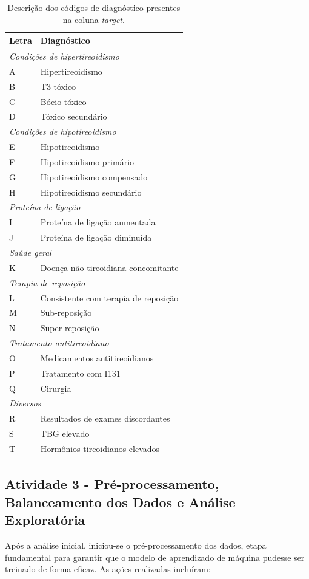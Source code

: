 \documentclass[11pt]{article}
\begin{document}
\begin{table}[H]
\centering
\caption{Descrição dos códigos de diagnóstico presentes na coluna \textit{target}.}
\label{tab:target}
\begin{tabular}{ll}
\toprule
\textbf{Letra} & \textbf{Diagnóstico} \\
\midrule
\multicolumn{2}{l}{\textit{Condições de hipertireoidismo}} \\
A & Hipertireoidismo \\
B & T3 tóxico \\
C & Bócio tóxico \\
D & Tóxico secundário \\
\midrule
\multicolumn{2}{l}{\textit{Condições de hipotireoidismo}} \\
E & Hipotireoidismo \\
F & Hipotireoidismo primário \\
G & Hipotireoidismo compensado \\
H & Hipotireoidismo secundário \\
\midrule
\multicolumn{2}{l}{\textit{Proteína de ligação}} \\
I & Proteína de ligação aumentada \\
J & Proteína de ligação diminuída \\
\midrule
\multicolumn{2}{l}{\textit{Saúde geral}} \\
K & Doença não tireoidiana concomitante \\
\midrule
\multicolumn{2}{l}{\textit{Terapia de reposição}} \\
L & Consistente com terapia de reposição \\
M & Sub-reposição \\
N & Super-reposição \\
\midrule
\multicolumn{2}{l}{\textit{Tratamento antitireoidiano}} \\
O & Medicamentos antitireoidianos \\
P & Tratamento com I131 \\
Q & Cirurgia \\
\midrule
\multicolumn{2}{l}{\textit{Diversos}} \\
R & Resultados de exames discordantes \\
S & TBG elevado \\
T & Hormônios tireoidianos elevados \\
\bottomrule
\end{tabular}
\end{table}

\subsection{Atividade 3 - Pré-processamento, Balanceamento dos Dados e Análise Exploratória}
Após a análise inicial, iniciou-se o pré-processamento dos dados, etapa fundamental para garantir que o modelo de aprendizado de máquina pudesse ser treinado de forma eficaz. As ações realizadas incluíram:
\end{document}
